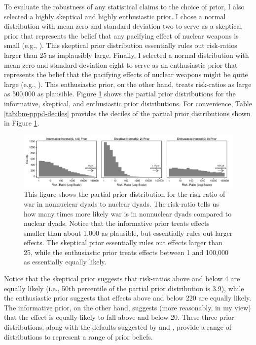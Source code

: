 \documentclass[12pt]{article}
\begin{document}
To evaluate the robustness of any statistical claims to the choice of prior, I also selected a highly skeptical and highly enthusiastic prior. 
I chose a normal distribution with mean zero and standard deviation two to serve as a skeptical prior that represents the belief that any pacifying effect of nuclear weapons is small (e.g., \citealt{Mueller1988}). 
This skeptical prior distribution essentially rules out risk-ratios larger than 25 as implausibly large. 
Finally, I selected a normal distribution with mean zero and standard deviation eight to serve as an enthusiastic prior that represents the belief that the pacifying effects of nuclear weapons might be quite large (e.g., \citealt{Mearsheimer1993}). 
This enthusiastic prior, on the other hand, treats risk-ratios as large as 500,000 as plausible. 
Figure \ref{fig:bm-pppd-hist} shows the partial prior distributions for the informative, skeptical, and enthusiastic prior distributions. 
For convenience, Table \ref{tab:bm-pppd-deciles} provides the deciles of the partial prior distributions shown in Figure \ref{fig:bm-pppd-hist}. 

\begin{figure}[H]
\begin{center}
\includegraphics[scale = .8]{figs/bm-pppd-hist.pdf}
\caption{This figure shows the partial prior distribution for the risk-ratio of war in nonnuclear dyads to nuclear dyads. 
The risk-ratio tells us how many times more likely war is in nonnuclear dyads compared to nuclear dyads. 
Notice that the informative prior treats effects smaller than about 1,000 as plausible, but essentially rules out larger effects. 
The skeptical prior essentially rules out effects larger than 25, while the enthusiastic prior treats effects between 1 and 100,000 as essentially equally likely.}\label{fig:bm-pppd-hist}
\end{center}
\end{figure}



Notice that the skeptical prior suggests that risk-ratios above and below 4 are equally likely (i.e., 50th percentile of the partial prior distribution is 3.9), while the enthusiastic prior suggests that effects above and below 220 are equally likely. 
The informative prior, on the other hand, suggests (more reasonably, in my view) that the effect is equally likely to fall above and below 20. 
These three prior distributions, along with the defaults suggested by \cite{Zorn2005} and \cite{Gelmanetal2008}, provide a range of distributions to represent a range of prior beliefs.
\end{document}
